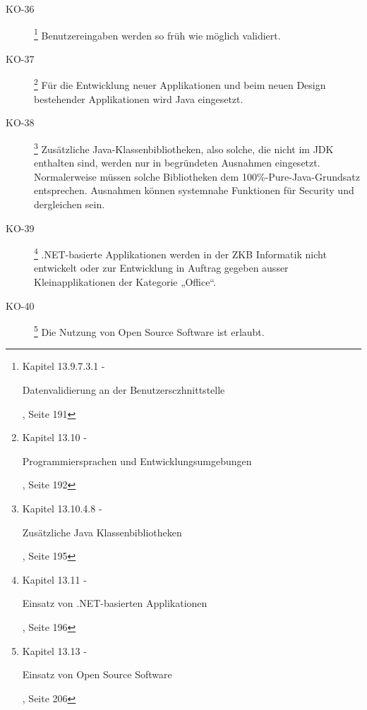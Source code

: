 \begin{description}
    \item[KO-36\label{itm:KO-36}]
    \footnote{\cite{ZkbHandbuchDerItArchitektur} Kapitel 13.9.7.3.1 -
    \begin{itshape}Datenvalidierung an der Benutzersczhnittstelle\end{itshape},
    Seite 191}
    Benutzereingaben werden so früh wie möglich validiert.
    
    \item[KO-37\label{itm:KO-37}]
    \footnote{\cite{ZkbHandbuchDerItArchitektur} Kapitel 13.10 -
    \begin{itshape}Programmiersprachen und Entwicklungsumgebungen\end{itshape},
    Seite 192}
    Für die Entwicklung neuer Applikationen und beim neuen Design bestehender
    Applikationen wird Java eingesetzt.
    
    \item[KO-38\label{itm:KO-38}]
    \footnote{\cite{ZkbHandbuchDerItArchitektur} Kapitel 13.10.4.8 -
    \begin{itshape}Zusätzliche Java Klassenbibliotheken\end{itshape}, Seite 195}
    Zusätzliche Java-Klassenbibliotheken, also solche, die nicht im JDK
    enthalten sind, werden nur in begründeten Ausnahmen eingesetzt.
    Normalerweise müssen solche Bibliotheken dem 100\%-Pure-Java-Grundsatz
    entsprechen. Ausnahmen können systemnahe Funktionen für Security und
    dergleichen sein.
    
    \item[KO-39\label{itm:KO-39}]
    \footnote{\cite{ZkbHandbuchDerItArchitektur} Kapitel 13.11 -
    \begin{itshape}Einsatz von .NET-basierten Applikationen\end{itshape}, Seite
    196}
    .NET-basierte Applikationen werden in der ZKB Informatik nicht entwickelt
    oder zur Entwicklung in Auftrag gegeben ausser Kleinapplikationen der
    Kategorie „Office“.
    
    \item[KO-40\label{itm:KO-40}]
    \footnote{\cite{ZkbHandbuchDerItArchitektur} Kapitel 13.13 -
    \begin{itshape}Einsatz von Open Source Software\end{itshape}, Seite 206}
    Die Nutzung von Open Source Software ist erlaubt.
    

\end{description}
